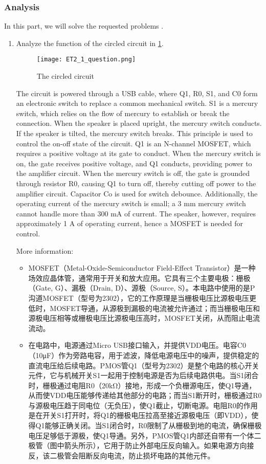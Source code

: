 \subsubsection{Analysis}
In this part, we will solve the requested problems .
\begin{enumerate}
	\item Analyze the function of the circled circuit in \cref{fig:question}.
	
	\begin{figure}[htbp]
		\centering
		\texttt{[image: ET2\_1\_question.png]}
		\caption{The circled circuit}
		\label{fig:question}
	\end{figure}
	
	The circuit is powered through a USB cable, where Q1, R0, S1, and C0 form an electronic switch to replace a common mechanical switch. S1 is a mercury switch, which relies on the flow of mercury to establish or break the connection. When the speaker is placed upright, the mercury switch conducts. If the speaker is tilted, the mercury switch breaks. This principle is used to control the on-off state of the circuit. Q1 is an N-channel MOSFET, which requires a positive voltage at its gate to conduct. When the mercury switch is on, the gate receives positive voltage, and Q1 conducts, providing power to the amplifier circuit. When the mercury switch is off, the gate is grounded through resistor R0, causing Q1 to turn off, thereby cutting off power to the amplifier circuit. Capacitor Co is used for switch debounce. Additionally, the operating current of the mercury switch is small; a 3 mm mercury switch cannot handle more than 300 mA of current. The speaker, however, requires approximately 1 A of operating current, hence a MOSFET is needed for control.
	
	More information:
	\begin{itemize}
		\item MOSFET（Metal-Oxide-Semiconductor Field-Effect Transistor）是一种场效应晶体管，通常用于开关和放大应用。它具有三个主要电极：栅极（Gate, G）、漏极（Drain, D）、源极（Source, S）。本电路中使用的是P沟道MOSFET（型号为2302），它的工作原理是当栅极电压比源极电压更低时，MOSFET导通，从源极到漏极的电流被允许通过；而当栅极电压和源极电压相等或栅极电压比源极电压高时，MOSFET关闭，从而阻止电流流动。
		
		\item 在电路中，电源通过Micro USB接口输入，并提供VDD电压。电容C0（10μF）作为旁路电容，用于滤波，降低电源电压中的噪声，提供稳定的直流电压给后续电路。PMOS管Q1（型号为2302）是整个电路的核心开关元件，它与机械开关S1一起用于控制电源是否为后续电路供电。当S1闭合时，栅极通过电阻R0（20kΩ）接地，形成一个负栅源电压，使Q1导通，从而使VDD电压能够传递给其他部分的电路；而当S1断开时，栅极通过R0与源极电压趋于同电位（无负压），使Q1截止，切断电源。电阻R0的作用是在开关S1打开时，将Q1的栅极电压拉高至接近源极电压（即VDD），使得Q1能够正确关闭。当S1闭合时，R0限制了从栅极到地的电流，确保栅极电压足够低于源极，使Q1导通。另外，PMOS管Q1内部还自带有一个体二极管（图中箭头所示），它用于防止外部电压反向输入。如果电源方向接反，该二极管会阻断反向电流，防止损坏电路的其他元件。
		

\end{itemize}
\end{enumerate}
